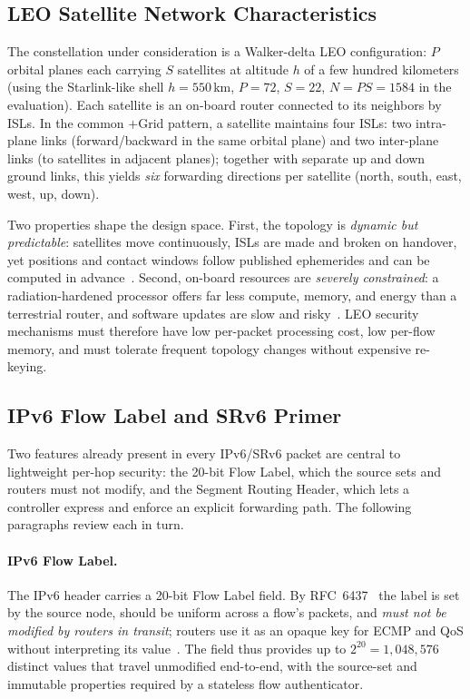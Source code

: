 \subsection{LEO Satellite Network Characteristics}
\label{sec:leo-char}

The constellation under consideration is a Walker-delta LEO configuration: $P$ orbital planes each carrying
$S$ satellites at altitude $h$ of a few hundred kilometers (using the
Starlink-like shell $h=550$\,km, $P=72$, $S=22$, $N=PS=1584$ in the evaluation). Each satellite is an on-board router connected to its
neighbors by ISLs. In the common $+$Grid pattern, a satellite maintains four ISLs: two
intra-plane links (forward/backward in the same orbital plane) and two
inter-plane links (to satellites in adjacent planes); together with separate
up and down ground links, this yields \emph{six} forwarding directions per
satellite (north, south, east, west, up, down).

Two properties shape the design space. First, the topology is
\emph{dynamic but predictable}: satellites move continuously, ISLs are made and
broken on handover, yet positions and contact windows follow published
ephemerides and can be computed in advance~\cite{handley,giuliari,kassing2023}. Second,
on-board resources are \emph{severely constrained}: a radiation-hardened
processor offers far less compute, memory, and energy than a terrestrial router,
and software updates are slow and risky~\cite{denby,del2019}. LEO security
mechanisms must therefore have low per-packet processing cost, low
per-flow memory, and must tolerate frequent topology changes without expensive
re-keying.

\subsection{IPv6 Flow Label and SRv6 Primer}
\label{sec:fl-srv6}

Two features already present in every IPv6/SRv6 packet are central to
lightweight per-hop security: the 20-bit Flow Label, which the source sets and
routers must not modify, and the Segment Routing Header, which lets a controller
express and enforce an explicit forwarding path. The following paragraphs review
each in turn.

\paragraph{IPv6 Flow Label.}
The IPv6 header carries a 20-bit Flow Label field. By RFC~6437~\cite{rfc6437}
the label is set by the source node, should be uniform across a flow's packets,
and \emph{must not be modified by routers in transit}; routers use it as an
opaque key for ECMP and QoS without interpreting its
value~\cite{rfc6438}. The field thus provides up to $2^{20}=1{,}048{,}576$
distinct values that travel unmodified end-to-end, with the source-set and immutable properties
required by a stateless flow authenticator.

